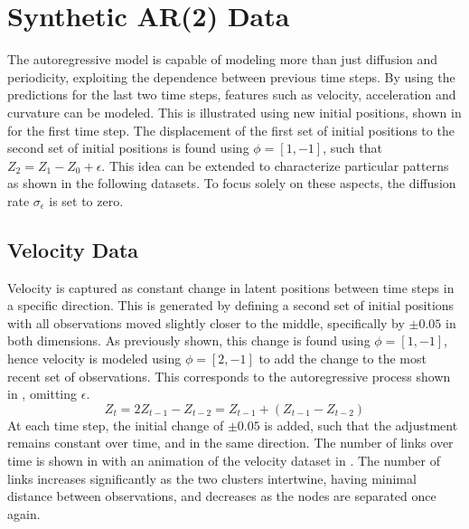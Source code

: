 \section{Synthetic AR(2) Data}

The autoregressive model is capable of modeling more than just diffusion and periodicity, exploiting the dependence between previous time steps. By using the predictions for the last two time steps, features such as velocity, acceleration and curvature can be modeled. This is illustrated using new initial positions, shown in  for the first time step. 
The displacement of the first set of initial positions to the second set of initial positions is found using $\phi=[1,-1]$, such that $Z_2 = Z_1 - Z_0 + \epsilon$. This idea can be extended to characterize particular patterns as shown in the following datasets. To focus solely on these aspects, the diffusion rate $\sigma_\epsilon$ is set to zero.
    
\subsection{Velocity Data}
    
    Velocity is captured as constant change in latent positions between time steps in a specific direction. This is generated by defining a second set of initial positions with all observations moved slightly closer to the middle, specifically by $\pm0.05$ in both dimensions. As previously shown, this change is found using $\phi=[1,-1]$, hence velocity is modeled using $\phi=[2,-1]$ to add the change to the most recent set of observations. This corresponds to the autoregressive process shown in , omitting $\epsilon$.
    \begin{equation}\label{eq:data-velocity}
        Z_t = 2 Z_{t-1} - Z_{t-2} = Z_{t-1} + (Z_{t-1} - Z_{t-2})
    \end{equation}
    At each time step, the initial change of $\pm0.05$ is added, such that the adjustment remains constant over time, and in the same direction. The number of links over time is shown in  with an animation of the velocity dataset in .
    The number of links increases significantly as the two clusters intertwine, having minimal distance between observations, and decreases as the nodes are separated once again.
    
